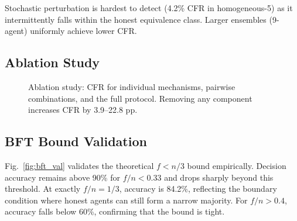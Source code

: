 \documentclass[journal,10pt]{IEEEtran}
\begin{document}
Stochastic perturbation is hardest to detect (4.2\% CFR in homogeneous-5) as it intermittently falls within the honest equivalence class. Larger ensembles (9-agent) uniformly achieve lower CFR.

\subsection{Ablation Study}

\begin{figure}[t]
\centering
{}
\caption{Ablation study: CFR for individual mechanisms, pairwise combinations, and the full protocol. Removing any component increases CFR by 3.9--22.8 pp.}
\label{fig:ablation}
\end{figure}

\subsection{BFT Bound Validation}
Fig.~\ref{fig:bft_val} validates the theoretical $f < n/3$ bound empirically. Decision accuracy remains above 90\% for $f/n < 0.33$ and drops sharply beyond this threshold. At exactly $f/n = 1/3$, accuracy is 84.2\%, reflecting the boundary condition where honest agents can still form a narrow majority. For $f/n > 0.4$, accuracy falls below 60\%, confirming that the bound is tight.
\end{document}
